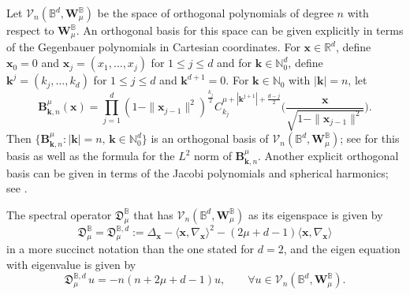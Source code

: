 \documentclass{amsart}
\theoremstyle{remark}
\def\la{{\langle}}
\def\ra{{\rangle}}
\def\fD{{\mathfrak D}}
\def\l{{\lambda}}
\def\la{{\langle}}
\def\ra{{\rangle}}
\def\kb{{\bm k}}
\def\CV{{\mathcal V}}
\def\BB{{\mathbb B}}
\def\NN{{\mathbb N}}
\def\RR{{\mathbb R}}
\begin{document}
Let $\CV_n\left(\BB^d, \bm W_\mu^\BB\right)$ be the space of orthogonal polynomials of degree $n$ with respect to $\bm W^\BB_\mu$. 
An orthogonal basis for this space can be given explicitly in terms of the Gegenbauer polynomials in Cartesian coordinates. For 
$\bm x \in \RR^d$, define $\bm x_0 =0$ and $\bm x_j = (x_1,\ldots, x_j)$ for $1 \le j \le d$ and for $\kb \in \NN_0^d$, define 
$\kb^j = (k_j, \ldots, k_d)$ for $1 \le j \le d$ and $\kb^{d+1} =0$. For $\kb \in \NN_0$ with $|\kb| = n$, let 
\begin{equation}\label{eq:OP_BB}
 \bm B_{\kb, n}^\mu(\bm x) = \prod_{j=1}^d \left(1-\|\bm x_{j-1}\|^2\right)^{\frac{k_j}{2}} C_{k_j}^{ \mu+ |\kb^{j+1}| + \frac{d-j}{2}} \bigg(\frac{\bm x}{\sqrt{1-\| \bm x_{j-1} \|^2}} \bigg). 
\end{equation}
Then $\{\bm B_{\kb,n}^\mu: |\kb|=n, \, \kb \in \NN_0^d\}$ is an orthogonal basis of 
$\CV_n\left(\BB^d, \bm W_\mu^\BB\right)$; see \cite[p. 143]{DX} for this basis as well as the formula 
for the $L^2$ norm of $\bm B_{\kb, n}^\mu$. Another explicit orthogonal basis can be given in terms of 
the Jacobi polynomials and spherical harmonics; see \cite[p. 142]{DX}. 
 
The spectral operator $\fD_\mu^\BB$ that has $\CV_n\left(\BB^d, \bm W_\mu^\BB\right)$ as its eigenspace is given by
\begin{equation} \label{eq:Diff-ball}
\fD_\mu^{\BB} = \fD_\mu^{\BB,d} :=  \Delta_{\bm x} - \la \bm x, \nabla_{\bm x}\ra ^2 - (2\mu + d-1) \la \bm x, \nabla_{\bm x} \ra  
\end{equation}
in a more succinct notation than the one stated for $d = 2$, and the eigen equation with eigenvalue is given by 
\begin{equation} \label{eq:D-ball}
\fD_\mu^{\BB,d}\, u = -n(n+2\mu+d-1) u, \qquad \forall u \in \CV_n\! \left(\BB^d, \bm W_\mu^\BB\right).
\end{equation} 
\end{document}
